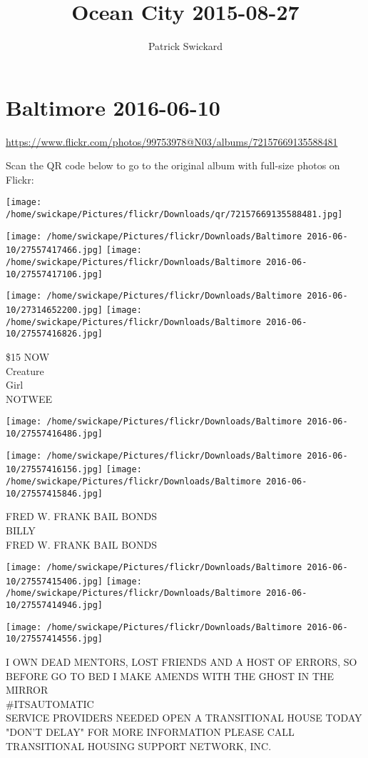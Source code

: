 \documentclass[10pt,letterpaper]{article}
\title{Ocean City 2015-08-27}
\author{Patrick Swickard}
\date{}
\begin{document}
\section*{Baltimore 2016-06-10}

\url{https://www.flickr.com/photos/99753978@N03/albums/72157669135588481}

Scan the QR code below to go to the original album with full-size photos on Flickr:

\texttt{[image: /home/swickape/Pictures/flickr/Downloads/qr/72157669135588481.jpg]}
\pagebreak

\texttt{[image: /home/swickape/Pictures/flickr/Downloads/Baltimore 2016-06-10/27557417466.jpg]}
\texttt{[image: /home/swickape/Pictures/flickr/Downloads/Baltimore 2016-06-10/27557417106.jpg]}

\texttt{[image: /home/swickape/Pictures/flickr/Downloads/Baltimore 2016-06-10/27314652200.jpg]}
\texttt{[image: /home/swickape/Pictures/flickr/Downloads/Baltimore 2016-06-10/27557416826.jpg]}

\$15 NOW\\
Creature\\
Girl\\
NOTWEE
\pagebreak

\texttt{[image: /home/swickape/Pictures/flickr/Downloads/Baltimore 2016-06-10/27557416486.jpg]}

\vspace{0.25in}
\texttt{[image: /home/swickape/Pictures/flickr/Downloads/Baltimore 2016-06-10/27557416156.jpg]}
\texttt{[image: /home/swickape/Pictures/flickr/Downloads/Baltimore 2016-06-10/27557415846.jpg]}

FRED W. FRANK BAIL BONDS\\
BILLY\\
FRED W. FRANK BAIL BONDS
\pagebreak

\texttt{[image: /home/swickape/Pictures/flickr/Downloads/Baltimore 2016-06-10/27557415406.jpg]}
\texttt{[image: /home/swickape/Pictures/flickr/Downloads/Baltimore 2016-06-10/27557414946.jpg]}

\vspace{0.25in}
\texttt{[image: /home/swickape/Pictures/flickr/Downloads/Baltimore 2016-06-10/27557414556.jpg]}

I OWN DEAD MENTORS, LOST FRIENDS AND A HOST OF ERRORS, SO BEFORE GO TO BED I MAKE AMENDS WITH THE GHOST IN THE MIRROR\\
\#ITSAUTOMATIC\\
SERVICE PROVIDERS NEEDED OPEN A TRANSITIONAL HOUSE TODAY "DON'T DELAY" FOR MORE INFORMATION PLEASE CALL TRANSITIONAL HOUSING SUPPORT NETWORK, INC.
\pagebreak
\end{document}
